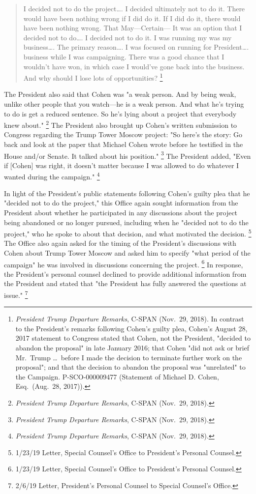 {\begin{quote}
I decided not to do the project\dots.
I decided ultimately not to do it.
There would have been nothing wrong if I did do it.
If I did do it, there would have been nothing wrong.
That
May---Certain---
It was an option that I decided not to do\dots.
I decided not to do it.
I was running my
was my business\dots.
The primary reason\dots.
I was focused on running for President\dots.
business while I was campaigning.
There was a good chance that I wouldn't have won, in which case I would've gone back into the business.
And why should I lose lots of opportunities?%
\footnote{\textit{President Trump Departure Remarks}, C-SPAN (Nov.~29, 2018).
In contrast to the President's remarks following Cohen's guilty plea, Cohen's August 28, 2017 statement to Congress stated that Cohen, not the President, "decided to abandon the proposal" in late January 2016;
that Cohen "did not ask or brief Mr.~Trump \dots\ before I made the decision to terminate further work on the proposal";
and that the decision to abandon the proposal was "unrelated" to the Campaign. P-SCO-000009477 (Statement of Michael D. Cohen, Esq.\ (Aug.~28, 2017)).
}
\end{quote}

The President also said that Cohen was "a weak person.
And by being weak, unlike other people that you watch---he is a weak person.
And what he's trying to do is get a reduced sentence.
So he's lying about a project that everybody knew about."%
\footnote{\textit{President Trump Departure Remarks}, C-SPAN (Nov.~29, 2018).}
The President also brought up Cohen's written submission to Congress regarding the Trump Tower Moscow project:
"So here's the story: Go back and look at the paper that Michael Cohen wrote before he testified in the House and/or Senate.
It talked about his position."%
\footnote{\textit{President Trump Departure Remarks}, C-SPAN (Nov.~29, 2018).}
The President added, "Even if [Cohen] was right, it doesn't matter because I was allowed to do whatever I wanted during the campaign."%
\footnote{\textit{President Trump Departure Remarks}, C-SPAN (Nov.~29, 2018).}

In light of the President's public statements following Cohen's guilty plea that he "decided not to do the project," this Office again sought information from the President about whether he participated in any discussions about the project being abandoned or no longer pursued, including when he "decided not to do the project," who he spoke to about that decision, and what motivated the decision.%
\footnote{1/23/19 Letter, Special Counsel's Office to President's Personal Counsel.}
The Office also again asked for the timing of the President's discussions with Cohen about Trump Tower Moscow and asked him to specify "what period of the campaign" he was involved in discussions concerning the project.%
\footnote{1/23/19 Letter, Special Counsel's Office to President's Personal Counsel.}
In response, the President's personal counsel declined to provide additional information from the President and stated that "the President has fully answered the questions at issue."%
\footnote{2/6/19 Letter, President's Personal Counsel to Special Counsel's Office.}

}
